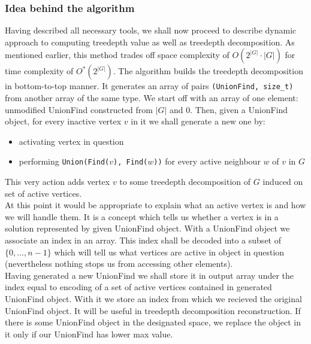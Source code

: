 \subsubsection{Idea behind the algorithm}
Having described all necessary tools, we shall now proceed to describe dynamic approach to computing treedepth value as well as treedepth decomposition. As mentioned earlier, this method trades off space complexity of $O\left(2^{\left|G\right|}\cdot\left|G\right|\right)$ for time complexity of  $O^{*}\left(2^{\left|G\right|}\right)$.
The algorithm builds the treedepth decomposition in bottom-to-top manner. It generates an array of pairs \texttt{(UnionFind, size\_t)} from another array of the same type. We start off with an array of one element: unmodified UnionFind constructed from $\left|G\right|$ and 0. Then, given a UnionFind object, for every inactive vertex $v$ in it we shall generate a new one by:
\begin{itemize}
	\item activating vertex in question
	\item performing \texttt{Union(Find($v$), Find($w$))} for every active neighbour $w$ of $v$ in $G$
\end{itemize}
This very action adds vertex $v$ to some treedepth decomposition of $G$ induced on set of active vertices.\\
At this point it would be appropriate to explain what an active vertex is and how we will handle them. It is a concept which tells us whether a vertex is in a solution represented by given UnionFind object. With a UnionFind object we associate an index in an array. This index shall be decoded into a subset of $\{0,...,n-1\}$ which will tell us what vertices are active in object in question (nevertheless nothing stops us from accessing other elements).\\
Having generated a new UnionFind we shall store it in output array under the index equal to encoding of a set of active vertices contained in generated UnionFind object. With it we store an index from which we recieved the original UnionFind object. It will be useful in treedepth decomposition reconstruction. If there is some UnionFind object in the designated space, we replace the object in it only if our UnionFind has lower max value.
